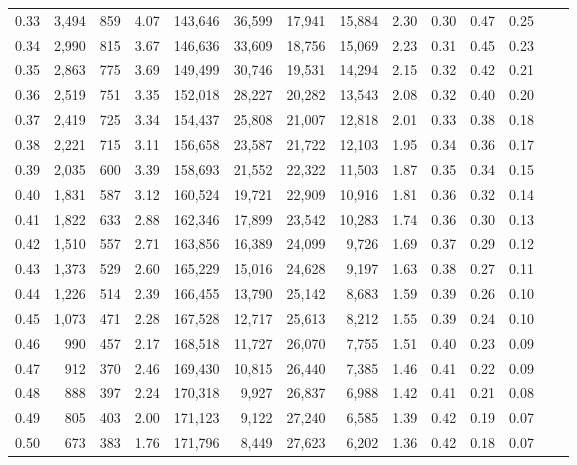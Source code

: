 \begin{tabular}{rrrrrrrrrrrrrr}
0.33 &  3,494 &  859 &    4.07 &  143,646 &   36,599 &  17,941 &  15,884 &  2.30 &  0.30 &  0.47 &      0.25 \\
0.34 &  2,990 &  815 &    3.67 &  146,636 &   33,609 &  18,756 &  15,069 &  2.23 &  0.31 &  0.45 &      0.23 \\
0.35 &  2,863 &  775 &    3.69 &  149,499 &   30,746 &  19,531 &  14,294 &  2.15 &  0.32 &  0.42 &      0.21 \\
0.36 &  2,519 &  751 &    3.35 &  152,018 &   28,227 &  20,282 &  13,543 &  2.08 &  0.32 &  0.40 &      0.20 \\
0.37 &  2,419 &  725 &    3.34 &  154,437 &   25,808 &  21,007 &  12,818 &  2.01 &  0.33 &  0.38 &      0.18 \\
0.38 &  2,221 &  715 &    3.11 &  156,658 &   23,587 &  21,722 &  12,103 &  1.95 &  0.34 &  0.36 &      0.17 \\
0.39 &  2,035 &  600 &    3.39 &  158,693 &   21,552 &  22,322 &  11,503 &  1.87 &  0.35 &  0.34 &      0.15 \\
0.40 &  1,831 &  587 &    3.12 &  160,524 &   19,721 &  22,909 &  10,916 &  1.81 &  0.36 &  0.32 &      0.14 \\
0.41 &  1,822 &  633 &    2.88 &  162,346 &   17,899 &  23,542 &  10,283 &  1.74 &  0.36 &  0.30 &      0.13 \\
0.42 &  1,510 &  557 &    2.71 &  163,856 &   16,389 &  24,099 &   9,726 &  1.69 &  0.37 &  0.29 &      0.12 \\
0.43 &  1,373 &  529 &    2.60 &  165,229 &   15,016 &  24,628 &   9,197 &  1.63 &  0.38 &  0.27 &      0.11 \\
0.44 &  1,226 &  514 &    2.39 &  166,455 &   13,790 &  25,142 &   8,683 &  1.59 &  0.39 &  0.26 &      0.10 \\
0.45 &  1,073 &  471 &    2.28 &  167,528 &   12,717 &  25,613 &   8,212 &  1.55 &  0.39 &  0.24 &      0.10 \\
0.46 &    990 &  457 &    2.17 &  168,518 &   11,727 &  26,070 &   7,755 &  1.51 &  0.40 &  0.23 &      0.09 \\
0.47 &    912 &  370 &    2.46 &  169,430 &   10,815 &  26,440 &   7,385 &  1.46 &  0.41 &  0.22 &      0.09 \\
0.48 &    888 &  397 &    2.24 &  170,318 &    9,927 &  26,837 &   6,988 &  1.42 &  0.41 &  0.21 &      0.08 \\
0.49 &    805 &  403 &    2.00 &  171,123 &    9,122 &  27,240 &   6,585 &  1.39 &  0.42 &  0.19 &      0.07 \\
0.50 &    673 &  383 &    1.76 &  171,796 &    8,449 &  27,623 &   6,202 &  1.36 &  0.42 &  0.18 &      0.07 \\

\end{tabular}
